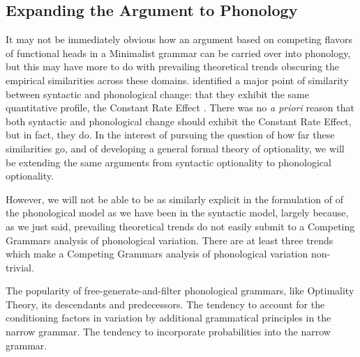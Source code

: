 
\subsection{Expanding the Argument to Phonology}

It may not be immediately obvious how an argument based on competing flavors of functional heads in a Minimalist grammar can be carried over into phonology, but this may have more to do with prevailing theoretical trends obscuring the empirical similarities across these domains.
\citet*{fruehwaldgresswallenberg2013} identified a major point of similarity between syntactic and phonological change: that they exhibit the same quantitative profile, the Constant Rate Effect \citep{kroch1989}.
There was no {\it a priori} reason that both syntactic and phonological change should exhibit the Constant Rate Effect, but in fact, they do.
In the interest of pursuing the question of how far these similarities go, and of developing a general formal theory of optionality, we will be extending the same arguments from syntactic optionality to phonological optionality.





However, we will not be able to be as similarly explicit in the formulation of of the phonological model as we have been in the syntactic model, largely because, as we just said, prevailing theoretical trends do not easily submit to a Competing Grammars analysis of phonological variation.
There are at least three trends which make a Competing Grammars analysis of phonological variation non-trivial.
\begin{exe}
	\ex \label{ot-tend}
		 The popularity of free-generate-and-filter phonological grammars, like Optimality Theory, its descendants and predecessors.
	\ex \label{gram-tend}
		The tendency to account for the conditioning factors in variation by additional grammatical principles in the narrow grammar.
	\ex \label{prob-tend}
		The tendency to incorporate probabilities into the narrow grammar.
\end{exe}



